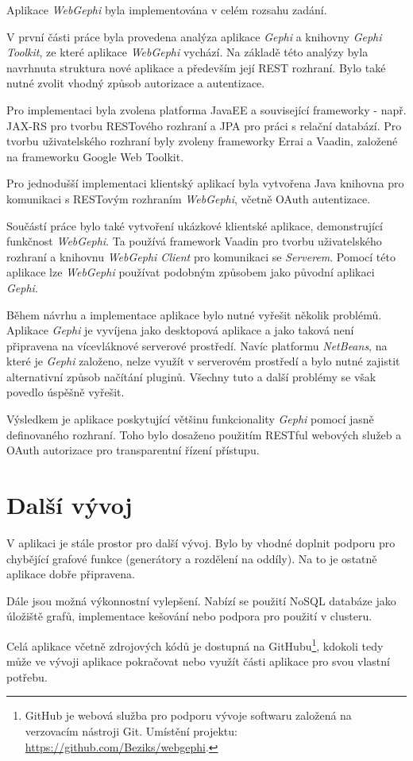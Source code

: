 \documentclass[thesis=M,czech]{FITthesis}[2014/05/6]
\begin{document}
\begin{conclusion}
	Aplikace \textit{WebGephi} byla implementována v celém rozsahu zadání. 
	
	V první části práce byla provedena analýza aplikace \textit{Gephi} a knihovny \textit{Gephi Toolkit}, ze které aplikace \textit{WebGephi} vychází.
	Na základě této analýzy byla navrhnuta struktura nové aplikace a především její REST rozhraní. Bylo také nutné zvolit vhodný způsob autorizace a
	autentizace.
	
	Pro implementaci byla zvolena platforma JavaEE a související frameworky - např. JAX-RS pro tvorbu RESTového rozhraní a JPA pro práci s relační databází.
	Pro tvorbu uživatelského rozhraní byly zvoleny frameworky Errai a Vaadin, založené na frameworku Google Web Toolkit.
	
	Pro jednodušší implementaci klientský aplikací byla vytvořena Java kni\-hov\-na pro komunikaci s RESTovým rozhraním \textit{WebGephi}, včetně OAuth autentizace.
	
	Součástí práce bylo také vytvoření ukázkové klientské aplikace, demonstrující funkčnost \textit{WebGephi}. Ta používá framework Vaadin pro tvorbu uživatelského rozhraní a 
	knihovnu \textit{WebGephi Client} pro komunikaci se \textit{Serverem}. Pomocí této aplikace lze \textit{WebGephi} používat podobným způsobem jako původní aplikaci \textit{Gephi}.
	
	Během návrhu a implementace aplikace bylo nutné vyřešit několik problémů. Aplikace \textit{Gephi} je vyvíjena jako desktopová aplikace a jako taková není 
	připravena na vícevláknové serverové prostředí. Navíc platformu \textit{NetBeans}, na které je \textit{Gephi} založeno, nelze využít v serverovém prostředí a bylo nutné zajistit 
	alternativní způsob načítání pluginů. Všechny tuto a další problémy se však povedlo úspěšně vyřešit.
	
	Výsledkem je aplikace poskytující většinu funkcionality \textit{Gephi} pomocí jasně definovaného rozhraní. Toho bylo dosaženo použitím RESTful webových služeb a OAuth autorizace 
	pro transparentní řízení přístupu.
	
	\section{Další vývoj}
	V aplikaci je stále prostor pro další vývoj. Bylo by vhodné doplnit podporu pro chybějící grafové funkce (generátory a rozdělení na oddíly). Na to je ostatně aplikace 
	dobře připravena.
	
	Dále jsou možná výkonnostní vylepšení. Nabízí se použití NoSQL databáze jako úložiště grafů, implementace kešování nebo podpora pro použití v clusteru.
	
	Celá aplikace včetně zdrojových kódů je dostupná na GitHubu\footnote{GitHub\cite{github} je webová služba pro podporu vývoje softwaru založená na verzovacím nástroji Git\cite{git}. Umístění projektu: \url{https://github.com/Beziks/webgephi}.}, kdokoli tedy může ve vývoji aplikace pokračovat
	nebo využít části aplikace pro svou vlastní potřebu.	
\end{conclusion}
\end{document}
